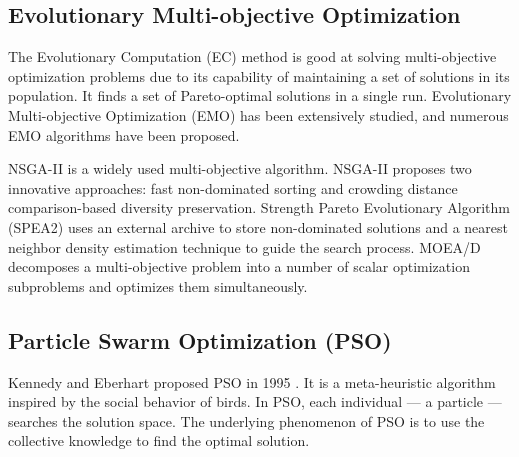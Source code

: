 \documentclass[10pt,journal,compsoc]{IEEEtran}
\begin{document}
\subsection{Evolutionary Multi-objective Optimization}
The Evolutionary Computation (EC) method is good at solving multi-objective optimization problems due to its capability of maintaining a set of solutions in its population. It finds a set of Pareto-optimal solutions in a single run. Evolutionary Multi-objective Optimization (EMO) has been extensively studied, and numerous EMO algorithms have been proposed.

NSGA-II \cite{nsgaii} is a widely used multi-objective algorithm. NSGA-II proposes two innovative approaches: fast non-dominated sorting and crowding distance comparison-based diversity preservation. 
Strength Pareto Evolutionary Algorithm (SPEA2)\cite{kim2004spea2} uses an external archive to store non-dominated solutions and a nearest neighbor density estimation technique to guide the search process. MOEA/D \cite{zhang2007moea} decomposes a multi-objective problem into a number of scalar optimization subproblems and optimizes them simultaneously.

\vspace{-3 mm}

\subsection{Particle Swarm Optimization (PSO)}
Kennedy and Eberhart proposed PSO in 1995 \cite{kennedy2011particle}. It is a meta-heuristic algorithm inspired by the social behavior of birds. In PSO, each individual --- a particle --- searches the solution space. The underlying phenomenon of PSO is to use the collective knowledge to find the optimal solution.
\end{document}
